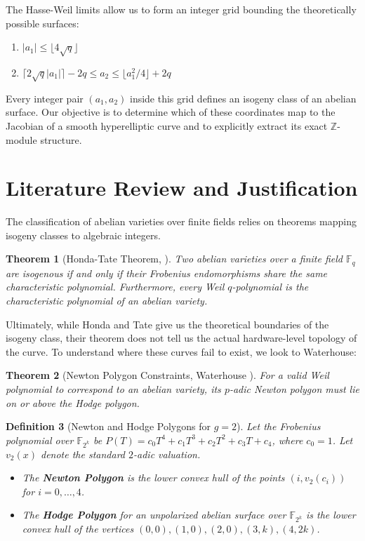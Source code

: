 \documentclass[letterpaper, 11pt]{article}
\newtheorem{theorem}{Theorem}[section]
\newtheorem{definition}[theorem]{Definition}
\begin{document}
The Hasse-Weil limits allow us to form an integer grid bounding the theoretically possible surfaces:
\begin{enumerate}
    \item $|a_1| \le \lfloor 4\sqrt{q} \rfloor$
    \item $\lceil 2\sqrt{q}|a_1| \rceil - 2q \le a_2 \le \lfloor a_1^2/4 \rfloor + 2q$
\end{enumerate}
Every integer pair $(a_1, a_2)$ inside this grid defines an isogeny class of an abelian surface. Our objective is to determine which of these coordinates map to the Jacobian of a smooth hyperelliptic curve and to explicitly extract its exact $\mathbb{Z}$-module structure.

\section{Literature Review and Justification}
The classification of abelian varieties over finite fields relies on theorems mapping isogeny classes to algebraic integers. 

\begin{theorem}[Honda-Tate Theorem, \cite{Honda1968, Tate1966}]
Two abelian varieties over a finite field $\mathbb{F}_q$ are isogenous if and only if their Frobenius endomorphisms share the same characteristic polynomial. Furthermore, every Weil $q$-polynomial is the characteristic polynomial of an abelian variety.
\end{theorem}

Ultimately, while Honda and Tate give us the theoretical boundaries of the isogeny class, their theorem does not tell us the actual hardware-level topology of the curve. To understand where these curves fail to exist, we look to Waterhouse:

\begin{theorem}[Newton Polygon Constraints, Waterhouse \cite{Waterhouse1969}]
For a valid Weil polynomial to correspond to an abelian variety, its $p$-adic Newton polygon must lie on or above the Hodge polygon.
\end{theorem}

\begin{definition}[Newton and Hodge Polygons for $g=2$]
Let the Frobenius polynomial over $\mathbb{F}_{2^k}$ be $P(T) = c_0T^4 + c_1T^3 + c_2T^2 + c_3T + c_4$, where $c_0=1$. Let $v_2(x)$ denote the standard $2$-adic valuation. 
\begin{itemize}
    \item The \textbf{Newton Polygon} is the lower convex hull of the points $(i, v_2(c_{i}))$ for $i = 0, \dots, 4$. 
    \item The \textbf{Hodge Polygon} for an unpolarized abelian surface over $\mathbb{F}_{2^k}$ is the lower convex hull of the vertices $(0,0), (1,0), (2,0), (3,k), (4,2k)$.
\end{itemize}
\end{definition}
\end{document}
